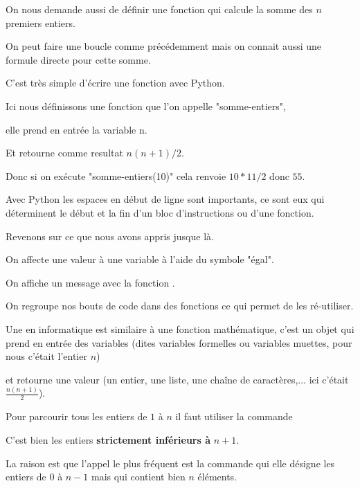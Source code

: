 \change

On nous demande aussi de définir une fonction qui calcule la somme des
$n$ premiers entiers.

\change

On peut faire une boucle comme précédemment mais on connait aussi une formule directe
pour cette somme.

\change

C'est très simple d'écrire une fonction avec Python.

Ici nous définissons une fonction que l'on appelle "somme-entiers",

elle prend en entrée la variable n.

Et retourne comme resultat $n(n+1)/2$.


Donc si on exécute "somme-entiers(10)" cela renvoie $10*11/2$ donc $55$.

Avec Python les espaces en début de ligne sont importants, ce sont eux qui déterminent le début 
et la fin d'un bloc d'instructions ou d'une fonction.

\diapo


Revenons sur ce que nous avons appris jusque là.

On affecte une valeur à une variable à l'aide du symbole "égal".


\change

On affiche un message avec la fonction .
    
\change

On regroupe nos bouts de code dans des fonctions ce qui permet de les ré-utiliser.

Une  en informatique est similaire à une fonction mathématique, 
c'est un objet qui prend en entrée des variables 
(dites variables formelles ou variables muettes, pour nous c'était l'entier $n$)

\change

et retourne une valeur 
(un entier, une liste, une chaîne de caractères,... ici c'était 
$\frac{n(n+1)}{2}$).

\change

Pour parcourir tous les entiers de $1$ à $n$ il faut utiliser la commande 

C'est bien les entiers \textbf{strictement inférieurs à} $n+1$.

\change

La raison est que l'appel le plus fréquent est la commande 
 qui elle 
désigne les entiers de $0$ à $n-1$ mais qui contient bien $n$ éléments.
 
